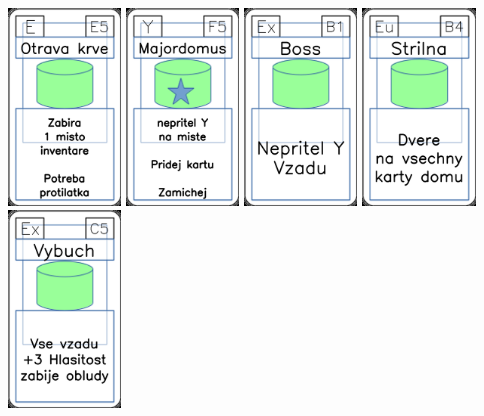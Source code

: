\documentclass[a4paper]{article}
\begin{document}
	\includegraphics[width=3.0cm]{img-4_54}
	\includegraphics[width=3.0cm]{img-5_29}
	\includegraphics[width=3.0cm]{img-4_5}
	\includegraphics[width=3.0cm]{img-4_38}
	\includegraphics[width=3.0cm]{img-4_14}
\end{document}
